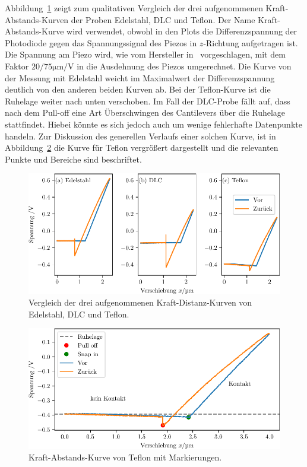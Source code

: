 Abbildung~\ref{fig: force_distance} zeigt zum qualitativen Vergleich der drei aufgenommenen Kraft-Abstands-Kurven der Proben
Edelstahl, DLC und Teflon. Der Name Kraft-Abstands-Kurve wird verwendet, obwohl in den Plots die Differenzspannung der Photodiode
gegen das Spannungssignal des Piezos in $z$-Richtung aufgetragen ist. Die Spannung am Piezo wird, wie vom Hersteller in~\cite{afm_datasheet}
vorgeschlagen, mit dem Faktor $20 / 75 \si{\micro\meter\per\volt}$ in die Ausdehnung des Piezos umgerechnet.
Die Kurve von der Messung mit Edelstahl weicht im Maximalwert der Differenzspannung deutlich von den anderen beiden Kurven ab. Bei der
Teflon-Kurve ist die Ruhelage weiter nach unten verschoben.
Im Fall der DLC-Probe fällt auf, dass nach dem Pull-off eine Art Überschwingen
des Cantilevers über die Ruhelage stattfindet. Hiebei könnte es sich jedoch auch um wenige fehlerhafte Datenpunkte handeln.
Zur Diskussion des generellen Verlaufs einer solchen Kurve, ist in Abbildung~\ref{fig: force_distance_teflon} die Kurve
für Teflon vergrößert dargestellt und die relevanten Punkte und Bereiche sind beschriftet.
\begin{figure}
  \centering
  \includegraphics[scale = 1]{../analysis/data/force_distance/force_distance.pdf}
  \caption{Vergleich der drei aufgenommenen Kraft-Distanz-Kurven von Edelstahl, DLC und Teflon.}
  \label{fig: force_distance}
\end{figure}
\begin{figure}
  \centering
  \includegraphics[scale = 1]{../analysis/data/force_distance/force_distance_teflon.pdf}
  \caption{Kraft-Abstands-Kurve von Teflon mit Markierungen.}
  \label{fig: force_distance_teflon}
\end{figure}
